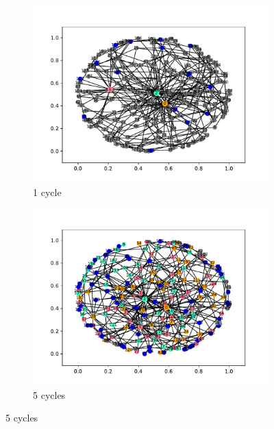 \begin{figure}[!h]
  \centering
  \begin{subfigure}[t]{.45\textwidth}
    \centering
    \includegraphics[trim={1cm .5cm 1cm 1cm}, clip, width=\linewidth]{img/pdf/plot-0001.pdf} 
    \caption{1 cycle} \label{fig:100}
  \end{subfigure}
  \begin{subfigure}[t]{.45\textwidth}
    \centering
    \includegraphics[trim={1cm .5cm 1cm 1cm}, clip, width=\linewidth]{img/pdf/plot-0005.pdf} 
    \caption{5 cycles} \label{fig:200}
  \end{subfigure}

  \vspace{0cm}


\end{figure}
